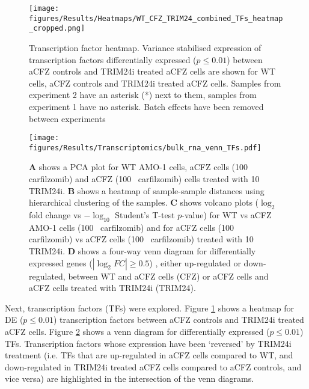 \begin{figure}[p]
\centering
\texttt{[image: figures/Results/Heatmaps/WT\_CFZ\_TRIM24\_combined\_TFs\_heatmap\_cropped.png]}
\caption[Transcription factor heatmap]{Transcription factor heatmap.
Variance stabilised expression of transcription factors differentially expressed ($p \leq 0.01$) between aCFZ controls and TRIM24i treated aCFZ cells are shown for WT cells, aCFZ controls and TRIM24i treated aCFZ cells.
Samples from experiment 2 have an asterisk (*) next to them, samples from experiment 1 have no asterisk.
Batch effects have been removed between experiments}
\label{fig:bulk_tf_heatmap}
\end{figure}

\begin{figure}[htb]
\centering
\texttt{[image: figures/Results/Transcriptomics/bulk\_rna\_venn\_TFs.pdf]}
\caption[Transcription factor venn diagrams WT, aCFZ control and aCFZ TRIM24i treated]{\textbf{A} shows a PCA plot for WT AMO-1 cells, aCFZ cells (100\si{\nano\Molar} carfilzomib) and aCFZ (100\si{\nano\Molar} carfilzomib) cells treated with 10\si{\mu\Molar} TRIM24i.
\textbf{B} shows a heatmap of sample-sample distances using hierarchical clustering of the samples.
\textbf{C} shows volcano plots ($\log_{2}$ fold change vs $-\log_{10}$ Student's T-test $p$-value) for WT vs aCFZ AMO-1 cells (100\si{\nano\Molar} carfilzomib) and for aCFZ cells (100\si{\nano\Molar} carfilzomib) vs aCFZ cells (100\si{\nano\Molar} carfilzomib) treated with 10\si{\mu\Molar} TRIM24i.
\textbf{D} shows a four-way venn diagram for differentially expressed genes ($|\log_{2}FC| \geq 0.5$) , either up-regulated or down-regulated, between WT and aCFZ cells (CFZ) or aCFZ cells and aCFZ cells treated with TRIM24i (TRIM24).}
\label{fig:bulk_tf_venn}
\end{figure}

Next, transcription factors (TFs) were explored.
Figure \ref{fig:bulk_tf_heatmap} shows a heatmap for DE ($p \leq 0.01$) transcription factors between aCFZ controls and TRIM24i treated aCFZ cells.
Figure \ref{fig:bulk_tf_venn} shows a venn diagram for differentially expressed ($p \leq 0.01$) TFs.
Transcription factors whose expression have been `reversed' by TRIM24i treatment (i.e. TFs that are up-regulated in aCFZ cells compared to WT, and down-regulated in TRIM24i treated aCFZ cells compared to aCFZ controls, and vice versa) are highlighted in the intersection of the venn diagrams.


